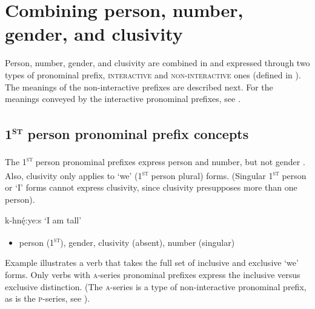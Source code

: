 \section{Combining person, number, gender, and clusivity} \label{Combining person, number, gender, and clusivity}
Person, number, gender, and clusivity are combined in and expressed through two types of pronominal prefix, \textsc{interactive} and \textsc{non-interactive} ones (defined in ). The meanings of the non-interactive prefixes are described next. For the meanings conveyed by the interactive pronominal prefixes, see .

\subsection{\textsc{1\textsuperscript{st}} person pronominal prefix concepts} \label{1st person pronominal prefix concepts}
The \textsc{1\textsuperscript{st}} person pronominal prefixes express person and number, but not gender . Also, clusivity only applies to ‘we’ (\textsc{1\textsuperscript{st}} person plural) forms. (Singular \textsc{1\textsuperscript{st}} person or ‘I’ forms cannot express clusivity, since clusivity presupposes more than one person). 

\ea\label{ex:1stex100}
k-hnę́:ye:s ‘I am tall’\label{ex:1stex100a}
\begin{itemize}
    \item  person (\textsc{1\textsuperscript{st}}), gender, clusivity (absent), number (singular)
\end{itemize}
\z


Example  illustrates a verb that takes the full set of inclusive and exclusive ‘we’ forms. Only verbs with \textsc{a}-series pronominal prefixes express the inclusive versus exclusive distinction. (The \textsc{a}-series is a type of non-interactive pronominal prefix, as is the \textsc{p}-series, see ).


